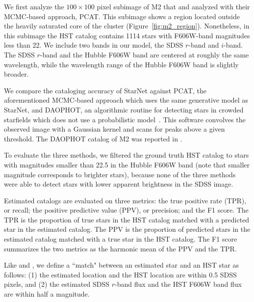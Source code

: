 We first analyze the $100 \times 100$ pixel subimage of M2 that
\cite{Portillo_2017} and \cite{Feder_2019} analyzed with their MCMC-based approach, PCAT.
This subimage shows a region located outside the heavily saturated core of the cluster (Figure~\ref{fig:m2_region}). 
Nonetheless, in this subimage the HST catalog contains 1114 stars with F606W-band magnitudes less than 22.
We include two bands in our model, the SDSS $r$-band and $i$-band.
The SDSS $r$-band and the Hubble F606W band are centered at roughly the same wavelength,
while the wavelength range of the Hubble F606W band is slightly broader.

We compare the cataloging accuracy of StarNet
against PCAT, the aforementioned MCMC-based approach which uses the same generative model as StarNet, 
and DAOPHOT, an algorithmic routine for detecting stars in crowded starfields
which does not use a probabilistic model~\citep{stetson2987daophot}.
This software convolves the observed image with a Gaussian kernel and scans for peaks above a given threshold.
The DAOPHOT catalog of M2 was reported in \cite{An_2008_m2}.



To evaluate the three methods, we filtered the ground truth HST catalog to stars with magnitudes smaller than 22.5 in the Hubble F606W band
(note that smaller magnitude corresponds to brighter stars),
because none of the three methods were able to detect stars
with lower apparent brightness in the SDSS image.


Estimated catalogs are evaluated on three metrics: the true positive rate (TPR), or recall;
the positive predictive value (PPV), or precision;
and the F1 score.
The TPR is the proportion of true stars in the HST catalog matched with a predicted star in the estimated catalog.
The PPV is the proportion of predicted stars in the estimated catalog matched with a true star in the HST catalog.
The F1 score summarizes the two metrics as the harmonic mean of the PPV and the TPR.

Like \cite{Portillo_2017} and \cite{Feder_2019}, we define a ``match" between an estimated star
and an HST star as follows: (1) the estimated location and the HST location are within 0.5 SDSS pixels,
and (2) the estimated SDSS $r$-band flux and the HST F606W band flux are within half a magnitude.

